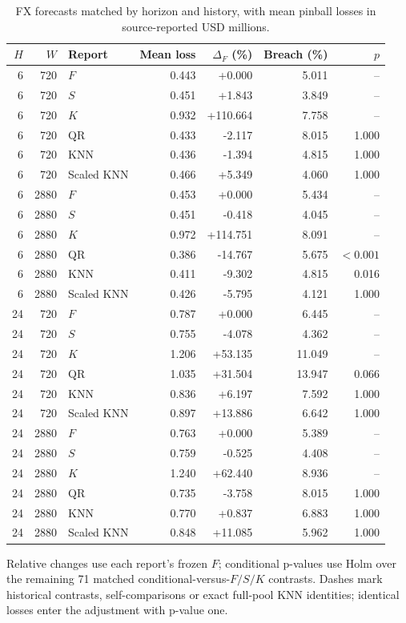 \begin{table}[!htbp]
\centering\small
\caption{FX forecasts matched by horizon and history, with mean pinball losses in source-reported USD millions.}\label{tab:fx}
\begin{tabular}{rrlrrrr}
\toprule
$H$ & $W$ & Report & Mean loss & $\Delta_F$ (\%) & Breach (\%) & $p$ \\
\midrule
6 & 720 & $F$ & 0.443 & +0.000 & 5.011 & -- \\
6 & 720 & $S$ & 0.451 & +1.843 & 3.849 & -- \\
6 & 720 & $K$ & 0.932 & +110.664 & 7.758 & -- \\
6 & 720 & QR & 0.433 & -2.117 & 8.015 & 1.000 \\
6 & 720 & KNN & 0.436 & -1.394 & 4.815 & 1.000 \\
6 & 720 & Scaled KNN & 0.466 & +5.349 & 4.060 & 1.000 \\
6 & 2880 & $F$ & 0.453 & +0.000 & 5.434 & -- \\
6 & 2880 & $S$ & 0.451 & -0.418 & 4.045 & -- \\
6 & 2880 & $K$ & 0.972 & +114.751 & 8.091 & -- \\
6 & 2880 & QR & 0.386 & -14.767 & 5.675 & $<0.001$ \\
6 & 2880 & KNN & 0.411 & -9.302 & 4.815 & 0.016 \\
6 & 2880 & Scaled KNN & 0.426 & -5.795 & 4.121 & 1.000 \\
24 & 720 & $F$ & 0.787 & +0.000 & 6.445 & -- \\
24 & 720 & $S$ & 0.755 & -4.078 & 4.362 & -- \\
24 & 720 & $K$ & 1.206 & +53.135 & 11.049 & -- \\
24 & 720 & QR & 1.035 & +31.504 & 13.947 & 0.066 \\
24 & 720 & KNN & 0.836 & +6.197 & 7.592 & 1.000 \\
24 & 720 & Scaled KNN & 0.897 & +13.886 & 6.642 & 1.000 \\
24 & 2880 & $F$ & 0.763 & +0.000 & 5.389 & -- \\
24 & 2880 & $S$ & 0.759 & -0.525 & 4.408 & -- \\
24 & 2880 & $K$ & 1.240 & +62.440 & 8.936 & -- \\
24 & 2880 & QR & 0.735 & -3.758 & 8.015 & 1.000 \\
24 & 2880 & KNN & 0.770 & +0.837 & 6.883 & 1.000 \\
24 & 2880 & Scaled KNN & 0.848 & +11.085 & 5.962 & 1.000 \\
\bottomrule
\end{tabular}
\par\smallskip\begin{minipage}{\linewidth}\footnotesize Relative changes use each report's frozen $F$; conditional p-values use Holm over the remaining 71 matched conditional-versus-$F/S/K$ contrasts. Dashes mark historical contrasts, self-comparisons or exact full-pool KNN identities; identical losses enter the adjustment with p-value one.\end{minipage}
\end{table}
